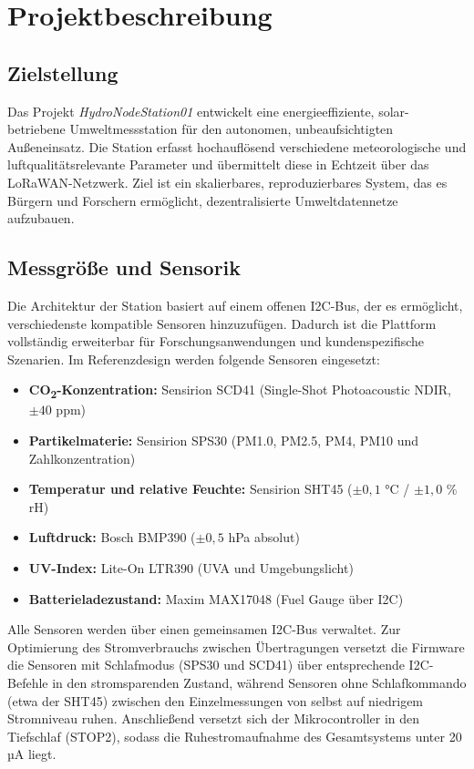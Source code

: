 \chapter{Projektbeschreibung}

\section*{Zielstellung}

Das Projekt \textit{HydroNodeStation01} entwickelt eine energieeffiziente, solar-betriebene Umweltmessstation für den autonomen, unbeaufsichtigten Außeneinsatz. Die Station erfasst hochauflösend verschiedene meteorologische und luftqualitätsrelevante Parameter und übermittelt diese in Echtzeit über das LoRaWAN-Netzwerk. Ziel ist ein skalierbares, reproduzierbares System, das es Bürgern und Forschern ermöglicht, dezentralisierte Umweltdatennetze aufzubauen.

\section*{Messgröße und Sensorik}

Die Architektur der Station basiert auf einem offenen I2C-Bus, der es ermöglicht, verschiedenste kompatible Sensoren hinzuzufügen. Dadurch ist die Plattform vollständig erweiterbar für Forschungsanwendungen und kundenspezifische Szenarien. Im Referenzdesign werden folgende Sensoren eingesetzt:

\begin{itemize}
  \item \textbf{CO\textsubscript{2}-Konzentration:} Sensirion SCD41 (Single-Shot Photoacoustic NDIR, $\pm 40$ ppm)
  \item \textbf{Partikelmaterie:} Sensirion SPS30 (PM1.0, PM2.5, PM4, PM10 und Zahlkonzentration)
  \item \textbf{Temperatur und relative Feuchte:} Sensirion SHT45 ($\pm 0{,}1$ °C / $\pm 1{,}0$ \% rH)
  \item \textbf{Luftdruck:} Bosch BMP390 ($\pm 0{,}5$ hPa absolut)
  \item \textbf{UV-Index:} Lite-On LTR390 (UVA und Umgebungslicht)
  \item \textbf{Batterieladezustand:} Maxim MAX17048 (Fuel Gauge über I2C)
\end{itemize}

Alle Sensoren werden über einen gemeinsamen I2C-Bus verwaltet. Zur Optimierung des Stromverbrauchs zwischen Übertragungen versetzt die Firmware die Sensoren mit Schlafmodus (SPS30 und SCD41) über entsprechende I2C-Befehle in den stromsparenden Zustand, während Sensoren ohne Schlafkommando (etwa der SHT45) zwischen den Einzelmessungen von selbst auf niedrigem Stromniveau ruhen. Anschließend versetzt sich der Mikrocontroller in den Tiefschlaf (STOP2), sodass die Ruhestromaufnahme des Gesamtsystems unter 20 µA liegt.

